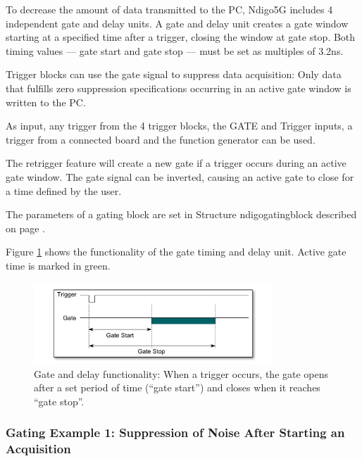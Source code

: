         To decrease the amount of data transmitted to the PC, Ndigo5G includes 4 independent gate and delay units. A gate and delay unit creates a gate window starting at a specified time after a trigger, closing the window at gate stop. Both timing values — gate start and gate stop — must be set as multiples of 3.2ns.\par

        Trigger blocks can use the gate signal to suppress data acquisition: Only data that fulfills zero suppression specifications occurring in an active gate window is written to the PC.\par
        As input, any trigger from the 4 trigger blocks, the GATE and Trigger inputs, a trigger from a connected board and the function generator can be used.\par

        The retrigger feature will create a new gate if a trigger occurs during an active gate window. The gate signal can be inverted, causing an active gate to close for a time defined by the user.\par

        The parameters of a gating block are set in Structure \textsf{ndigo\tu gating\tu block} described on page \pageref{cp:gatingblock}.\par

        Figure \ref{fig:GateUDelay} shows the functionality of the gate timing and delay unit. Active gate time is marked in green.

        \begin{figure}[ht]
            \begin{center}
                \includegraphics[width=0.8\textwidth]{figures/GateUDelay.pdf}
                \caption{\label{fig:GateUDelay} Gate and delay functionality: When a trigger occurs, the gate opens after a set period of time (``gate start'') and closes when it reaches ``gate stop''.}
            \end{center}
        \end{figure}

        \subsubsection{Gating Example 1: Suppression of Noise After Starting an Acquisition}

